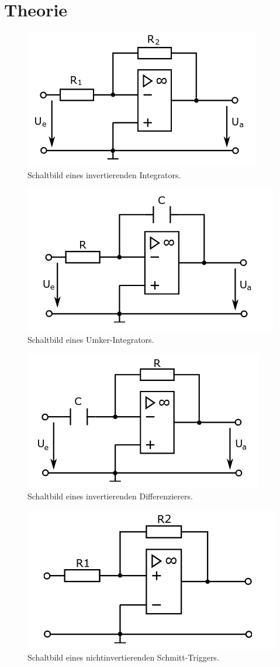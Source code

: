 \section{Theorie}
\label{sec:Theorie}


\begin{figure}
    \centering 
    \includegraphics[width=.5\textwidth]{Bilder/Inv_Lin.png}
    \caption{Schaltbild eines invertierenden Integrators.}
    \label{fig:Inv_Lin}
\end{figure}



\begin{figure}
    \centering 
    \includegraphics[width=.5\textwidth]{Bilder/Um_Int.png}
    \caption{Schaltbild eines Umker-Integrators.}
    \label{fig:Um_Int}
\end{figure}

\begin{figure}
    \centering 
    \includegraphics[width=.5\textwidth]{Bilder/Inv_Dif.png}
    \caption{Schaltbild eines invertierenden Differenzierers.}
    \label{fig:Inv_Dif}
\end{figure}

\begin{figure}
    \centering 
    \includegraphics[width=.5\textwidth]{Bilder/Schmitt.png}
    \caption{Schaltbild eines nichtinvertierenden Schmitt-Triggers.}
    \label{fig:Schmitt}
\end{figure}

